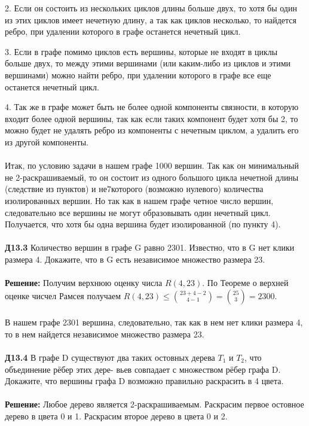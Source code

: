 \documentclass[a4paper, 12pt]{article}
\begin{document}
    \par 2. Если он состоить из нескольких циклов длины больше двух, то хотя бы один из этих циклов имеет нечетную длину, а так как циклов несколько, то найдется ребро, при удалении которого в графе останется нечетный цикл. 
    \par 3. Если в графе помимо циклов есть вершины, которые не входят в циклы больше двух, то между этими вершинами (или каким-либо из циклов и этими вершинами) можно найти ребро, при удалении которого в графе все еще останется нечетный цикл.
    \par 4. Так же в графе может быть не более одной компоненты связности, в которую входит более одной вершины, так как если таких компонент будет хотя бы 2, то можно будет не удалять ребро из компоненты с нечетным циклом, а удалить его из другой компоненты.
    \\
    \\ Итак, по условию задачи в нашем графе 1000 вершин. Так как он минимальный не 2-раскрашиваемый, то он состоит из одного большого цикла нечетной длины (следствие из пунктов) и не7которого (возможно нулевого) количества изолированных вершин. Но так как в нашем графе четное число вершин, следовательно все вершины не могут образовывать один нечетный цикл. Получается, что хотя бы одна вершина будет изолированной (по пункту 4).
    \\
    \\ \textbf{Д13.3} Количество вершин в графе G равно 2301. Известно, что в G нет клики размера 4. Докажите,
    что в G есть независимое множество размера 23.
    \\
    \\ \textbf{Решение: } Получим верхнюю оценку числа $R(4, 23)$. По Теореме о верхней оценке чисчел Рамсея получаем $R(4, 23) \leq \binom{23 + 4 - 2}{4 - 1} = \binom{25}{3} = 2300$. 
    \\
    \\ В нашем графе 2301 вершина, следовательно, так как в нем нет клики размера 4, то в нем найдется независимое множество размера 23.
    \\
    \\ \textbf{Д13.4} В графе D существуют два таких остовных дерева $T_1$ и $T_2$, что объединение рёбер этих дере-
    вьев совпадает с множеством рёбер графа D. Докажите, что вершины графа D возможно правильно
    раскрасить в 4 цвета.
    \\
    \\ \textbf{Решение: } Любое дерево является 2-раскрашиваемым. Раскрасим первое остовное дерево в цвета 0 и 1. Раскрасим второе дерево в цвета 0 и 2. 
\end{document}
